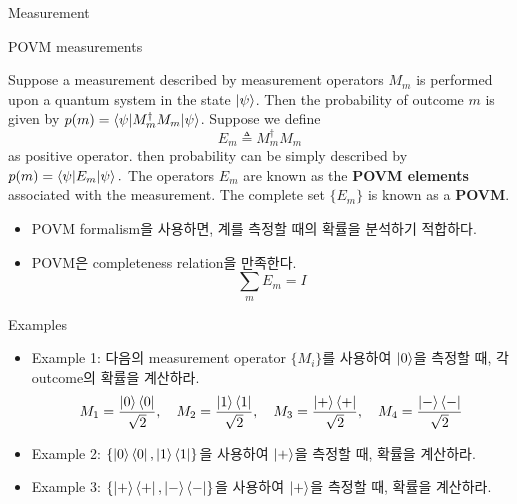 \documentclass[9pt]{beamer}
\begin{document}
\begin{section}{Measurement}
        \begin{frame}{POVM measurements}
            \begin{definition}
                Suppose a measurement described by measurement operators $M_m$ is performed upon a quantum system in the state $\ket \psi$. Then the probability of outcome $m$ is given by $p(m) = \braket{\psi | M_m^\dagger M_m | \psi}$. Suppose we define
                $$E_m \triangleq M_m^\dagger M_m$$ 
                as positive operator.
                then probability can be simply described by $p(m) = \braket{\psi | E_m | \psi}.$
                The operators $E_m$ are known as the \textbf{POVM elements} associated with the measurement. The complete set $\{E_m\}$ is known as a \textbf{POVM}.
            \end{definition}
            \begin{itemize}
                \item POVM formalism을 사용하면, 계를 측정할 때의 확률을 분석하기 적합하다.
                \item POVM은 completeness relation을 만족한다.
                $$\sum_m E_m = I$$
            \end{itemize}
        \end{frame}

        \begin{frame}{Examples}
            \begin{itemize}
                \item Example 1: 다음의 measurement operator $\{M_i\}$를 사용하여 $\ket 0$을 측정할 때, 각 outcome의 확률을 계산하라.
                $$M_1 = \frac{\ket 0 \bra 0}{\sqrt 2}, \quad M_2 = \frac{\ket 1 \bra 1}{\sqrt 2}, \quad M_3 = \frac{\ket + \bra +}{\sqrt 2}, \quad M_4 = \frac{\ket - \bra -}{\sqrt 2}$$
                \vspace{1cm}
                
                \item Example 2: $\{\ket 0 \bra 0, \ket 1 \bra 1\}$을 사용하여 $\ket +$을 측정할 때, 확률을 계산하라.
                
                \vspace{1.3cm}

                \item Example 3: $\{\ket + \bra +, \ket - \bra -\}$을 사용하여 $\ket +$을 측정할 때, 확률을 계산하라.
            
            \end{itemize}
        \end{frame}


\end{section}
\end{document}
